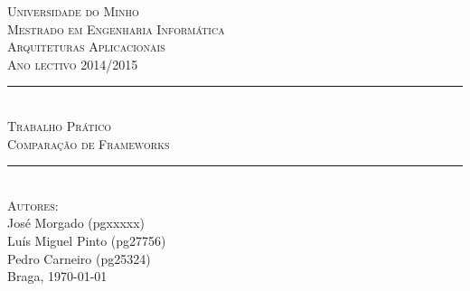 \begin{titlepage}
\onehalfspacing

\newcommand{\HRule}{\rule{\linewidth}{0.5mm}} %

\center %


\textsc{\LARGE Universidade do Minho}\\[1.5cm] %
\textsc{\Large Mestrado em Engenharia Informática}\\[0.5cm] %
\textsc{\large Arquiteturas Aplicacionais}\\[0.5cm] %
\textsc{Ano lectivo 2014/2015}\\[0.5cm]


\HRule \\[0.4cm]
\textsc{\Large Trabalho Prático}\\[0.4cm] %
\textsc{ \large Comparação de Frameworks}\\[0.4cm] %
\HRule \\[1.5cm]


\textsc{\large Autores:}\\
{
José Morgado (pgxxxxx) \\
Luís Miguel Pinto (pg27756) \\
Pedro Carneiro (pg25324)
}\\[1cm] %


Braga, {\large \today}\\[1cm] %


\end{titlepage}
